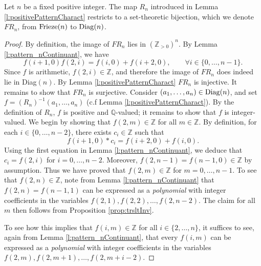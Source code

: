 \begin{proposition}
    \label{prop:testCriteria}
    Let $n$ be a fixed positive integer. The map $R_n$ introduced in Lemma \ref{l:positivePatternCharact} restricts 
    to a set-theoretic bijection, which we denote $FR_n$, from ${\rm Frieze}(n)$ to ${\rm Diag}(n)$. 
\end{proposition}
\begin{proof}
    By definition, the image of $FR_n$ lies in $(\mathbb{Z}_{>0})^n$. By Lemma \ref{l:pattern_nContinuant}, we have 
    \[
        f (i+1,0) f (2,i) = f (i,0) + f (i+2, 0), \qquad \forall i \in \{0,\ldots, n-1\}.
    \]
    Since $f$ is arithmetic, $f (2,i) \in \mathbb{Z}$, and therefore the image of $FR_n$ does indeed lie in Diag$(n)$. 
    By Lemma \ref{l:positivePatternCharact} $FR_n$ is injective. It 
    remains to show that $FR_n$ is surjective. Consider $(a_1, \ldots, a_n) \in {\rm Diag}(n)$, and set $f = (R_n)^{-1}(a_1, \ldots, a_n)$ 
    (c.f Lemma \ref{l:positivePatternCharact}). By the definition of $R_n$, $f$ is positive and $\mathbb{Q}$-valued; 
    it remains to show that $f$ is integer-valued. We begin by showing that $f (2,m) \in \mathbb{Z}$ for all $m \in \mathbb{Z}$. 
    By definition, for each 
    $i \in \{0,\ldots, n-2\}$, there exists $c_i \in \mathbb{Z}$ such that
    \[
        f(i+1,0) * c_i = f (i+2,0) + f (i,0).    
    \]
    Using the first equation in Lemma \ref{l:pattern_nContinuant}, we deduce that $c_i = f(2,i)$ for $i =0, \ldots, n-2$. 
    Moreover, $ f (2,n-1) = f (n-1,0) \in \mathbb{Z}$ by assumption. Thus we have proved that 
    $f (2,m) \in \mathbb{Z}$ for $m = 0, \ldots, n-1$. To see that $f (2,n) \in \mathbb{Z}$, note from 
    Lemma \ref{l:pattern_nContinuant} that $f (2,n) = f (n-1,1)$ can be expressed as a {\it polynomial} with 
    integer coefficients in the variables $f (2,1), f (2,2),\ldots , f (2,n-2)$. The claim for all $m$ then follows from 
    Proposition \ref{prop:trsltInv}. 

    To see how this implies that $f (i,m) \in \mathbb{Z}$ for all $i \in \{2, \ldots, n\}$, it suffices to 
    see, again from Lemma \ref{l:pattern_nContinuant}, that every $f (i,m)$ can be expressed as a {\it polynomial} with 
    integer coefficients in the variables $f (2,m), f (2,m+1),\ldots , f (2,m+i-2)$.
\end{proof}

